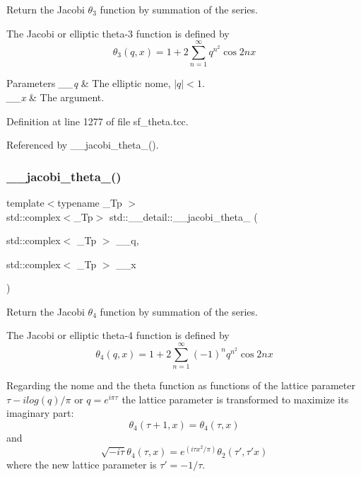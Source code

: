 Return the Jacobi $ \theta_3 $ function by summation of the series.

The Jacobi or elliptic theta-\/3 function is defined by \[ \theta_3(q,x) = 1 + 2\sum_{n=1}^{\infty} q^{n^2}\cos{2nx} \]


\begin{DoxyParams}{Parameters}
{\em \+\_\+\+\_\+q} & The elliptic nome, $ |q| < 1 $. \\
\hline
{\em \+\_\+\+\_\+x} & The argument. \\
\hline
\end{DoxyParams}


Definition at line 1277 of file sf\+\_\+theta.\+tcc.



Referenced by \+\_\+\+\_\+jacobi\+\_\+theta\+\_().

\mbox{\label{namespacestd_1_1____detail_a1cb3d69015e808baeaf98cd3310f38c3}} 
\subsubsection{\texorpdfstring{\+\_\+\+\_\+jacobi\+\_\+theta\+\_()}{\_\_jacobi\_theta\_4()}\hspace{0.1cm}{\footnotesize\ttfamily [1/2]}}
{\footnotesize\ttfamily template$<$typename \+\_\+\+Tp $>$ \\
std\+::complex$<$\+\_\+\+Tp$>$ std\+::\+\_\+\+\_\+detail\+::\+\_\+\+\_\+jacobi\+\_\+theta\+\_ (\begin{DoxyParamCaption}\item[{std\+::complex$<$ \+\_\+\+Tp $>$}]{\+\_\+\+\_\+q,  }\item[{std\+::complex$<$ \+\_\+\+Tp $>$}]{\+\_\+\+\_\+x }\end{DoxyParamCaption})}

Return the Jacobi $ \theta_4 $ function by summation of the series.

The Jacobi or elliptic theta-\/4 function is defined by \[ \theta_4(q,x) = 1 + 2\sum_{n=1}^{\infty}(-1)^n q^{n^2}\cos{2nx} \]

Regarding the nome and the theta function as functions of the lattice parameter $ \tau -i log(q)/ \pi $ or $ q = e^{i\pi\tau} $ the lattice parameter is transformed to maximize its imaginary part\+: \[ \theta_4(\tau+1,x) = \theta_4(\tau,x) \] and \[ \sqrt{-i\tau}\theta_4(\tau,x) = e^{(i\tau x^2/\pi)}\theta_2(\tau',\tau' x) \] where the new lattice parameter is $ \tau' = -1/\tau $.

